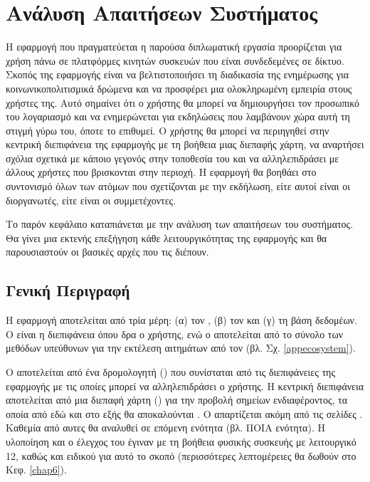 \chapter{Ανάλυση Απαιτήσεων Συστήματος}
\label{chap3}

Η εφαρμογή που πραγματεύεται η παρούσα διπλωματική εργασία προορίζεται για χρήση πάνω σε πλατφόρμες κινητών συσκευών που είναι συνδεδεμένες σε δίκτυο. Σκοπός της εφαρμογής είναι να βελτιστοποιήσει τη διαδικασία της ενημέρωσης για κοινωνικοπολιτισμικά δρώμενα και να προσφέρει μια ολοκληρωμένη εμπειρία στους χρήστες της. Αυτό σημαίνει ότι ο χρήστης θα μπορεί να δημιουργήσει τον προσωπικό του λογαριασμό και να ενημερώνεται για εκδηλώσεις που λαμβάνουν χώρα αυτή τη στιγμή γύρω του, όποτε το επιθυμεί. Ο χρήστης θα μπορεί να περιηγηθεί στην κεντρική διεπιφάνεια της εφαρμογής με τη βοήθεια μιας διεπαφής χάρτη, να αναρτήσει σχόλια σχετικά με κάποιο γεγονός στην τοποθεσία του και να αλληλεπιδράσει με άλλους χρήστες που βρισκονται στην περιοχή. Η εφαρμογή θα βοηθάει στο συντονισμό όλων των ατόμων που σχετίζονται με την εκδήλωση, είτε αυτοί είναι οι διοργανωτές, είτε είναι οι συμμετέχοντες.

Το παρόν κεφάλαιο καταπιάνεται με την ανάλυση των απαιτήσεων του συστήματος. Θα γίνει μια εκτενής επεξήγηση κάθε λειτουργικότητας της εφαρμογής και θα παρουσιαστούν οι βασικές αρχές που τις διέπουν.

\section{Γενική Περιγραφή}
Η εφαρμογή αποτελείται από τρία μέρη: (α) τον , (β) τον  και (γ) τη βάση δεδομέων. Ο  είναι η διεπιφάνεια όπου δρα ο χρήστης, ενώ ο  αποτελείται από το σύνολο των μεθόδων υπεύθυνων για την εκτέλεση αιτημάτων από τον  (βλ. Σχ. \ref{appecosystem}).

Ο  αποτελείται από ένα δρομολογητή () που συνίσταται από τις διεπιφάνειες της εφαρμογής με τις οποίες μπορεί να αλληλεπιδράσει ο χρήστης. Η κεντρική διεπιφάνεια αποτελείται από μια διεπαφή χάρτη () για την προβολή σημείων ενδιαφέροντος, τα οποία από εδώ και στο εξής θα αποκαλούνται . Ο  απαρτίζεται ακόμη από τις σελίδες . Καθεμία από αυτες θα αναλυθεί σε επόμενη ενότητα (βλ. ΠΟΙΑ ενότητα). Η υλοποίηση και ο έλεγχος του  έγιναν με τη βοήθεια φυσικής συσκευής με λειτουργικό  12, καθώς και ειδικού  για αυτό το σκοπό (περισσότερες λεπτομέρειες θα δωθούν στο Κεφ. \ref{chap6}).

